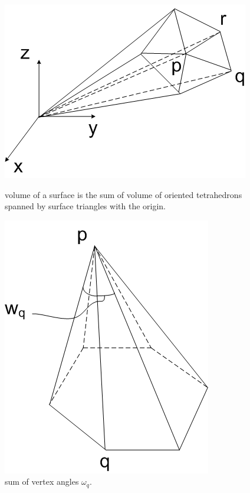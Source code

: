 \documentclass[11pt]{article}
\begin{document}
\begin{figure}[htbp]
  \begin{minipage}[b]{0.45\linewidth}
\centering
\includegraphics[width=\textwidth]{volume.png}
\caption{volume of a surface is the sum of volume of oriented tetrahedrons spanned by surface triangles with the origin.}
\label{fig:volume}
  \end{minipage}
  \hspace{0.5cm}
  \begin{minipage}[b]{0.45\linewidth}
\centering
\includegraphics[width=\textwidth]{vertex_angles.png}
\caption{sum of vertex angles $\omega_q$.}
\label{fig:vertex_angle}
  \end{minipage}
\end{figure}
\end{document}
